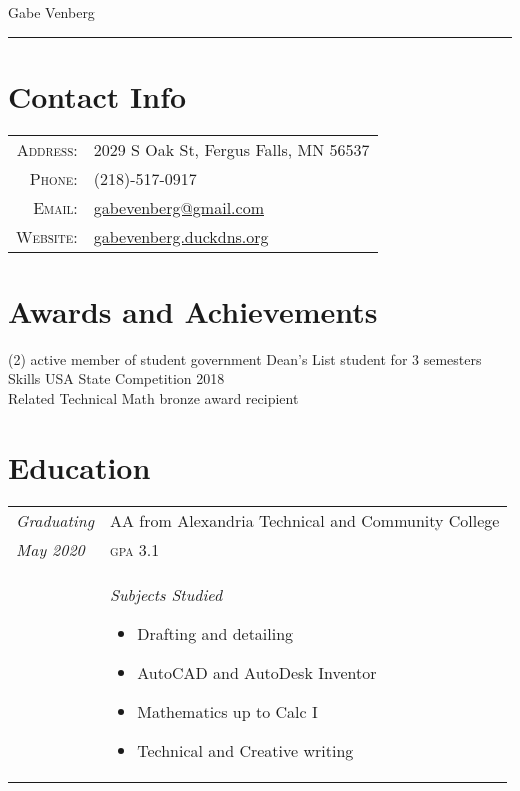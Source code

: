 \documentclass[letterpaper,10pt]{article}
\begin{document}
\pagestyle{empty}%

	\par{\centering
		{\huge Gabe Venberg
	}\bigskip\par}
\hrule
\section*{Contact Info}
	\begin{tabular}{rl}
	\textsc{Address:} & 2029 S Oak St, Fergus Falls, MN 56537\\
	\textsc{Phone:} & (218)-517-0917\\
	\textsc{Email:} & \href{mailto:gabevenberg@gmail.com}{gabevenberg@gmail.com}\\
	\textsc{Website:} & \href{gabevenberg.duckdns.org}{gabevenberg.duckdns.org}\\
	\end{tabular}
\section*{Awards and Achievements}
	\begin{tasks}[style=itemize](2)
	\task active member of student government
	\task Dean's List student for 3 semesters
	\task Skills USA State Competition 2018\\Related Technical Math bronze award recipient
	\end{tasks}
\section*{Education}
	\begin{tabular}{R{2cm}|p{14cm}}
	\textsl{Graduating} & AA from Alexandria Technical and Community College\\
	\textsl{May 2020} & \textsc{gpa} 3.1\\
	&\textsl{Subjects Studied} \begin{itemize}[noitemsep]
	\item Drafting and detailing
	\item AutoCAD and AutoDesk Inventor
	\item Mathematics up to Calc I
	\item Technical and Creative writing
	\end{itemize}
	\end{tabular}
\end{document}
